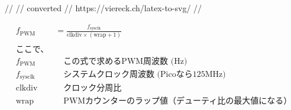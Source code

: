 //
// converted 
// https://viereck.ch/latex-to-svg/
//

\begin{align*}
f_{\mathrm{PWM}} &= \frac{f_{\mathrm{sysclk}}}{\mathrm{clkdiv} \times (\mathrm{wrap} + 1)} \\
\\
\text{ここで、}& \\
f_{\mathrm{PWM}}   &\quad \text{この式で求めるPWM周波数 (Hz)} \\
f_{\mathrm{sysclk}} &\quad \text{システムクロック周波数 (Picoなら125MHz)} \\
\mathrm{clkdiv}  &\quad \text{クロック分周比} \\
\mathrm{wrap}    &\quad \text{PWMカウンターのラップ値（デューティ比の最大値になる）} \\
\end{align*}